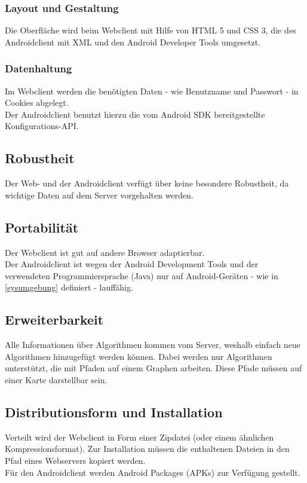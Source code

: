 \documentclass[a4paper,10pt,titlepage]{article}
\begin{document}
\subsubsection{Layout und Gestaltung}
Die Oberfläche wird beim Webclient mit Hilfe von HTML 5 und CSS 3, die des Androidclient mit XML und den Android Developer Tools umgesetzt.

\subsubsection{Datenhaltung} \label{datenhaltung}
Im Webclient werden die benötigten Daten - wie Benutzname und Passwort - in Cookies abgelegt.\\
Der Androidclient benutzt hierzu die vom Android SDK bereitgestellte Konfigurations-API.

\subsection{Robustheit}
Der Web- und der Androidclient verfügt über keine besondere Robustheit, da wichtige Daten auf dem Server vorgehalten werden.

\subsection{Portabilität}
Der Webclient ist gut auf andere Browser adaptierbar.\\
Der Androidclient ist wegen der Android Development Tools und der verwendeten Programmiersprache (Java) nur auf Android-Geräten - wie in \ref{sysumgebung} definiert - lauffähig.

\subsection{Erweiterbarkeit}
Alle Informationen über Algorithmen kommen vom Server, weshalb einfach neue Algorithmen hinzugefügt werden können.
Dabei werden nur Algorithmen unterstützt, die mit Pfaden auf einem Graphen arbeiten. Diese Pfade müssen auf einer Karte darstellbar sein.

\subsection{Distributionsform und Installation}
Verteilt wird der Webclient in Form einer Zipdatei (oder einem ähnlichen Kompressionsformat). Zur Installation müssen die enthaltenen Dateien in den Pfad eines Webservers kopiert werden.\\
Für den Androidclient werden Android Packages (APKs) zur Verfügung gestellt.
\end{document}
